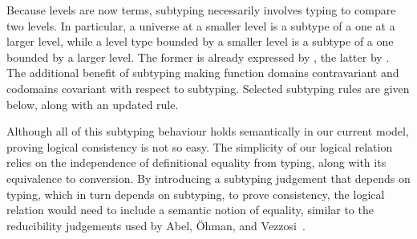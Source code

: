 \documentclass[a4paper,UKenglish,cleveref,autoref,thm-restate]{lipics-v2021}
\newcommand{\citep}[1]{\cite{#1}}
\begin{document}
Because levels are now terms,
subtyping necessarily involves typing to compare two levels.
In particular, a universe at a smaller level is a subtype of a one at a larger level,
while a level type bounded by a smaller level is a subtype of a one bounded by a larger level.
The former is already expressed by , the latter by .
The additional benefit of subtyping making
function domains contravariant and codomains covariant with respect to subtyping.
Selected subtyping rules are given below,
along with an updated  rule.
%

Although all of this subtyping behaviour holds semantically in our current model,
proving logical consistency is not so easy.
The simplicity of our logical relation relies on
the independence of definitional equality from typing,
along with its equivalence to conversion.
By introducing a subtyping judgement that depends on typing,
which in turn depends on subtyping, to prove consistency,
the logical relation would need to include a semantic notion of equality,
similar to the reducibility judgements used by Abel, \"Ohman, and Vezzosi~\citep{dec-conv}.
\end{document}
